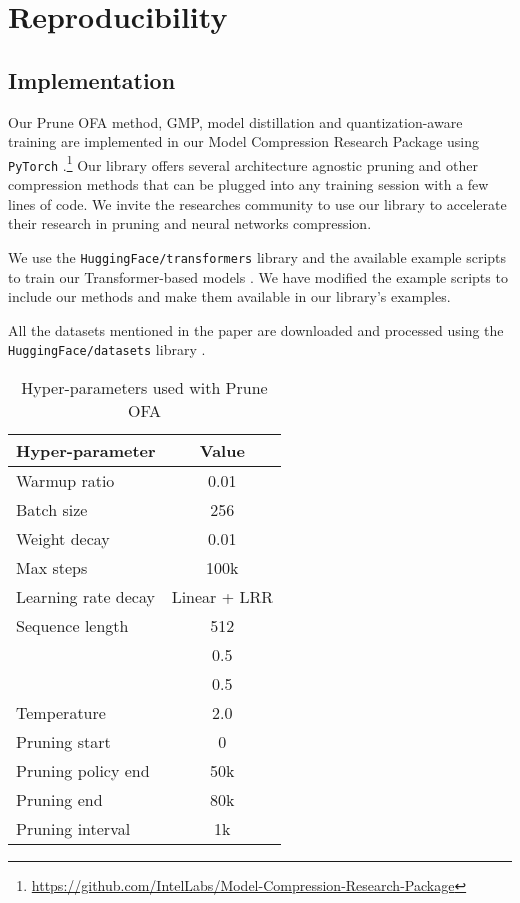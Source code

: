 \documentclass{article}
\begin{document}
\section{Reproducibility}
\label{app:reproduce}
\subsection{Implementation}
Our Prune OFA method, GMP, model distillation and quantization-aware training are implemented in our Model Compression Research Package using \texttt{PyTorch} \citep{paszke2019pytorch}.\footnote{\url{https://github.com/IntelLabs/Model-Compression-Research-Package}}
Our library offers several architecture agnostic pruning and other compression methods that can be plugged into any training session with a few lines of code.
We invite the researches community to use our library to accelerate their research in pruning and neural networks compression.

We use the \texttt{HuggingFace/transformers} library and the available example scripts to train our Transformer-based models \citep{wolf-etal-2020-transformers}.
We have modified the example scripts to include our methods and make them available in our library's examples.

All the datasets mentioned in the paper are downloaded and processed using the \texttt{HuggingFace/datasets} library \citep{quentin-lhoest-datasets}.


\begin{table}[t]
\centering
\caption{Hyper-parameters used with Prune OFA}
\label{tab:hyper-pofa}
\begin{tabular}{@{}lc@{}}
\toprule
Hyper-parameter & Value \\ \midrule
Warmup ratio & 0.01 \\
Batch size & 256 \\
Weight decay & 0.01 \\
Max steps & 100k \\
Learning rate decay & Linear + LRR \\
Sequence length & 512 \\
 & 0.5 \\
 & 0.5 \\
Temperature & 2.0 \\
Pruning start & 0 \\
Pruning policy end & 50k \\
Pruning end & 80k \\
Pruning interval & 1k \\ \bottomrule
\end{tabular}\end{table}
\end{document}
